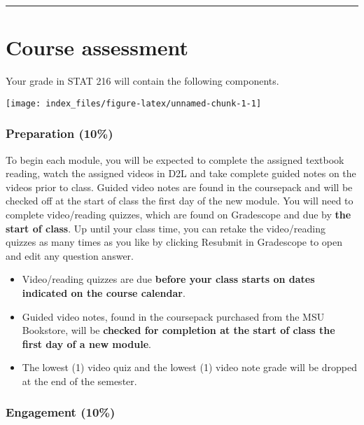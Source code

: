 \documentclass[
]{article}
\providecommand{\tightlist}{%
  \setlength{\itemsep}{0pt}\setlength{\parskip}{0pt}}
\begin{document}
\begin{center}\rule{0.5\linewidth}{0.5pt}\end{center}

\section{Course assessment}\label{course-assessment}

Your grade in STAT 216 will contain the following components.

\begin{center}\texttt{[image: index\_files/figure-latex/unnamed-chunk-1-1]} \end{center}

\subsubsection{Preparation (10\%)}\label{preparation-10}

To begin each module, you will be expected to complete the assigned
textbook reading, watch the assigned videos in D2L and take complete
guided notes on the videos prior to class. Guided video notes are found
in the coursepack and will be checked off at the start of class the
first day of the new module. You will need to complete video/reading
quizzes, which are found on Gradescope and due by \textbf{the start of
class}. Up until your class time, you can retake the video/reading
quizzes as many times as you like by clicking Resubmit in Gradescope to
open and edit any question answer.

\begin{itemize}
\tightlist
\item
  Video/reading quizzes are due \textbf{before your class starts on
  dates indicated on the course calendar}.
\item
  Guided video notes, found in the coursepack purchased from the MSU
  Bookstore, will be \textbf{checked for completion at the start of
  class the first day of a new module}.
\item
  The lowest (1) video quiz and the lowest (1) video note grade will be
  dropped at the end of the semester.
\end{itemize}

\subsubsection{Engagement (10\%)}\label{engagement-10}
\end{document}
